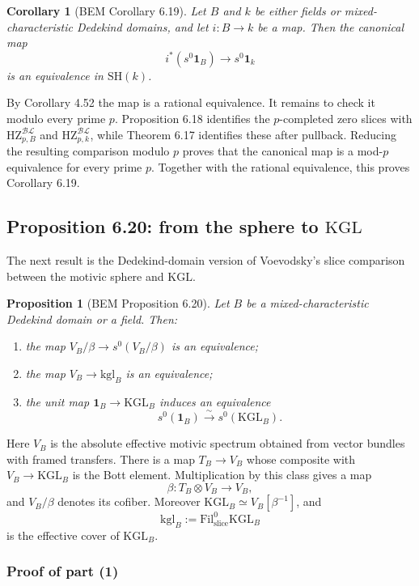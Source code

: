 \documentclass[11pt,a4paper]{article}
\newcommand{\SH}{\mathrm{SH}}
\newcommand{\BL}{\mathcal{BL}}
\newcommand{\KGL}{\mathrm{KGL}}
\newcommand{\kgl}{\mathrm{kgl}}
\newcommand{\HZ}{\mathrm{HZ}}
\newcommand{\Fil}{\mathrm{Fil}}
\newcommand{\1}{\mathbf 1}
\newcommand{\slic}{\mathrm{slice}}
\theoremstyle{bemstyle}
\newtheorem{proposition}[theorem]{Proposition}
\newtheorem{corollary}[theorem]{Corollary}
\theoremstyle{definition}
\begin{document}
\begin{corollary}[BEM Corollary 6.19]
Let \(B\) and \(k\) be either fields or mixed-characteristic Dedekind domains, and let \(i:B\to k\) be a map. Then the canonical map
\[
       i^*(s^0\1_B)\longrightarrow s^0\1_k
\]
is an equivalence in \(\SH(k)\).
\end{corollary}

By Corollary 4.52 the map is a rational equivalence. It remains to check it modulo every prime \(p\). Proposition 6.18 identifies the \(p\)-completed zero slices with \(\HZ^{\BL}_{p,B}\) and \(\HZ^{\BL}_{p,k}\), while Theorem 6.17 identifies these after pullback. Reducing the resulting comparison modulo \(p\) proves that the canonical map is a mod-\(p\) equivalence for every prime \(p\). Together with the rational equivalence, this proves Corollary 6.19.

\subsection{Proposition 6.20: from the sphere to \texorpdfstring{\(\KGL\)}{KGL}}

The next result is the Dedekind-domain version of Voevodsky's slice comparison between the motivic sphere and \(\KGL\).

\begin{proposition}[BEM Proposition 6.20]
Let \(B\) be a mixed-characteristic Dedekind domain or a field. Then:
\begin{enumerate}
  \item the map \(V_B/\beta\to s^0(V_B/\beta)\) is an equivalence;
  \item the map \(V_B\to\kgl_B\) is an equivalence;
  \item the unit map \(\1_B\to\KGL_B\) induces an equivalence
  \[
        s^0(\1_B)\xrightarrow{\sim}s^0(\KGL_B).
  \]
\end{enumerate}
\end{proposition}

Here \(V_B\) is the absolute effective motivic spectrum obtained from vector bundles with framed transfers. There is a map \(T_B\to V_B\) whose composite with \(V_B\to\KGL_B\) is the Bott element. Multiplication by this class gives a map
\[
       \beta:T_B\otimes V_B\longrightarrow V_B,
\]
and \(V_B/\beta\) denotes its cofiber. Moreover \(\KGL_B\simeq V_B[\beta^{-1}]\), and
\[
       \kgl_B:=\Fil^0_{\slic}\KGL_B
\]
is the effective cover of \(\KGL_B\).

\subsubsection{Proof of part (1)}
\end{document}
